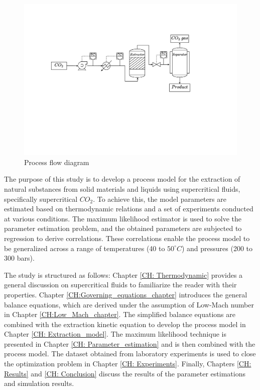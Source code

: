 \documentclass[../Article_Model_Parameters.tex]{subfiles}
\begin{document}
	\begin{figure}[h!]
		\centering
		\includegraphics[trim = 5cm 12cm 8cm 6cm, clip,width=\columnwidth]{Figures/PFD.pdf}
		\caption{Process flow diagram}
		\label{fig: SFE_drawing}
	\end{figure}

	The purpose of this study is to develop a process model for the extraction of natural substances from solid materials and liquids using supercritical fluids, specifically supercritical $CO_2$. To achieve this, the model parameters are estimated based on thermodynamic relations and a set of experiments conducted at various conditions. The maximum likelihood estimator is used to solve the parameter estimation problem, and the obtained parameters are subjected to regression to derive correlations. These correlations enable the process model to be generalized across a range of temperatures (40 to $50^\circ C$) and pressures (200 to 300 bars).
	
	The study is structured as follows: Chapter \ref{CH: Thermodynamic} provides a general discussion on supercritical fluids to familiarize the reader with their properties. Chapter \ref{CH:Governing_equations_chapter} introduces the general balance equations, which are derived under the assumption of Low-Mach number in Chapter \ref{CH:Low_Mach_chapter}. The simplified balance equations are combined with the extraction kinetic equation to develop the process model in Chapter \ref{CH: Extraction_model}. The maximum likelihood technique is presented in Chapter \ref{CH: Parameter_estimation} and is then combined with the process model. The dataset obtained from laboratory experiments is used to close the optimization problem in Chapter \ref{CH: Experiments}. Finally, Chapters \ref{CH: Results} and \ref{CH: Conclusion} discuss the results of the parameter estimations and simulation results.
		
\end{document}
